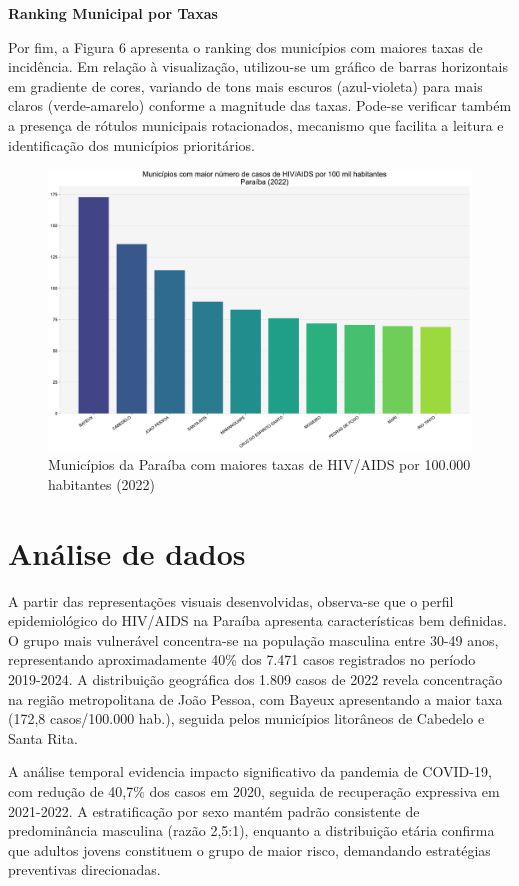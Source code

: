 \documentclass[10pt,a4paper]{article}
\begin{document}
\begin{multicols}{2}
\textbf{Ranking Municipal por Taxas}

Por fim, a Figura 6 apresenta o ranking dos municípios com maiores taxas de incidência. Em relação à visualização, utilizou-se um gráfico de barras horizontais em gradiente de cores, variando de tons mais escuros (azul-violeta) para mais claros (verde-amarelo) conforme a magnitude das taxas. Pode-se verificar também a presença de rótulos municipais rotacionados, mecanismo que facilita a leitura e identificação dos municípios prioritários.

\begin{figure}[H]
    \centering
    \includegraphics[width=\linewidth]{../figs/hiv_aids_pb_top_mun_2022.pdf}
    \caption{Municípios da Paraíba com maiores taxas de HIV/AIDS por 100.000 habitantes (2022)}
    \label{fig:top_municipios}
\end{figure}

\section{Análise de dados}

A partir das representações visuais desenvolvidas, observa-se que o perfil epidemiológico do HIV/AIDS na Paraíba apresenta características bem definidas. O grupo mais vulnerável concentra-se na população masculina entre 30-49 anos, representando aproximadamente 40\% dos 7.471 casos registrados no período 2019-2024. A distribuição geográfica dos 1.809 casos de 2022 revela concentração na região metropolitana de João Pessoa, com Bayeux apresentando a maior taxa (172,8 casos/100.000 hab.), seguida pelos municípios litorâneos de Cabedelo e Santa Rita. 

A análise temporal evidencia impacto significativo da pandemia de COVID-19, com redução de 40,7\% dos casos em 2020, seguida de recuperação expressiva em 2021-2022. A estratificação por sexo mantém padrão consistente de predominância masculina (razão 2,5:1), enquanto a distribuição etária confirma que adultos jovens constituem o grupo de maior risco, demandando estratégias preventivas direcionadas.


\end{multicols}
\end{document}
